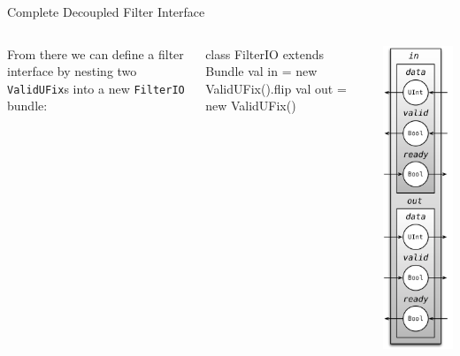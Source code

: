 \documentclass[xcolor=pdflatex,dvipsnames,table]{beamer}
\begin{document}
\begin{frame}[fragile]{Complete Decoupled Filter Interface}

\begin{columns}

From there we can define a filter interface by nesting two
\verb+ValidUFix+s into a new \verb+FilterIO+ bundle:

\begin{scala}
class FilterIO extends Bundle { 
  val in  = new ValidUFix().flip
  val out = new ValidUFix()
}
\end{scala}


\begin{center}
\includegraphics[height=0.9\textheight]{figs/decoupled-filter-io.pdf} 
\end{center}


\end{columns}
\end{frame}
\end{document}
